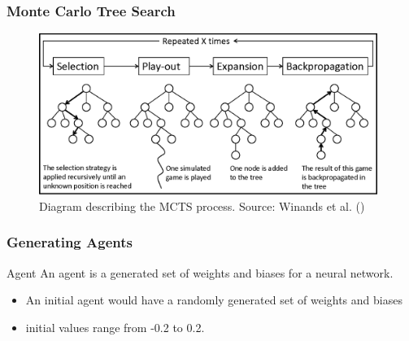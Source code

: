 \documentclass[aspectratio=169]{beamer}
\begin{document}
	\begin{frame}
		\frametitle{Monte Carlo Tree Search}

		
		\begin{figure}
			\includegraphics[width=110mm]{montecarlo.png}
			\caption{Diagram describing the MCTS process. Source: Winands et al. (\cite{winands_monte_2010})}
		\end{figure}


	\end{frame}

	\begin{frame}
		\frametitle{Generating Agents}
		\begin{block}{Agent}
			An agent is a generated set of weights and biases for a neural network.
		\end{block}

		\begin{itemize}
			\item An initial agent would have a randomly generated set of weights and biases
			\item initial values range from -0.2 to 0.2.
		\end{itemize}
	\end{frame}
\end{document}
